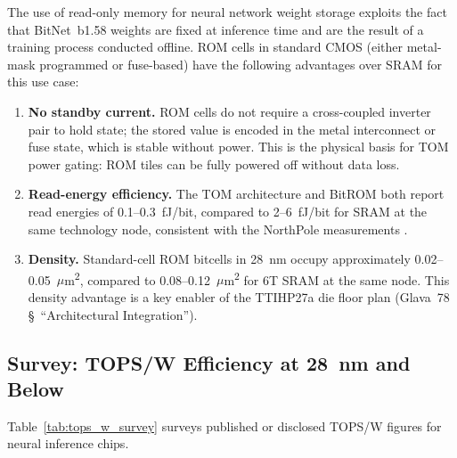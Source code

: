 The use of read-only memory for neural network weight storage exploits
the fact that BitNet~b1.58 weights are fixed at inference time and are
the result of a training process conducted offline.  ROM cells in
standard CMOS (either metal-mask programmed or fuse-based) have the
following advantages over SRAM for this use case:

\begin{enumerate}
  \item \textbf{No standby current.}  ROM cells do not require a cross-coupled
    inverter pair to hold state; the stored value is encoded in the metal
    interconnect or fuse state, which is stable without power.  This is the
    physical basis for TOM power gating: ROM tiles can be fully powered off
    without data loss.

  \item \textbf{Read-energy efficiency.}  The TOM architecture
    \cite{tom_arxiv_2602} and BitROM \cite{bitrom_2025} both report
    read energies of 0.1--0.3~fJ/bit, compared to 2--6~fJ/bit for
    SRAM at the same technology node, consistent with the NorthPole
    measurements \cite{ibm_northpole_2023}.

  \item \textbf{Density.}  Standard-cell ROM bitcells in 28~nm occupy
    approximately 0.02--0.05~\(\mu\)m\textsuperscript{2}, compared to
    0.08--0.12~\(\mu\)m\textsuperscript{2} for 6T SRAM at the same node.
    This density advantage is a key enabler of the TTIHP27a die floor plan
    (Glava~78 §~``Architectural Integration'').
\end{enumerate}

\subsection{Survey: TOPS/W Efficiency at 28~nm and Below}

Table~\ref{tab:tops_w_survey} surveys published or disclosed TOPS/W
figures for neural inference chips.

